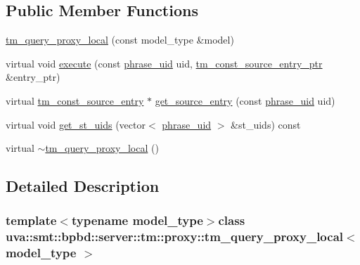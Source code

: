 \subsection*{Public Member Functions}
\begin{DoxyCompactItemize}
\item 
\hyperlink{classuva_1_1smt_1_1bpbd_1_1server_1_1tm_1_1proxy_1_1tm__query__proxy__local_a9daacb7e381485a8926633ff027b6494}{tm\+\_\+query\+\_\+proxy\+\_\+local} (const model\+\_\+type \&model)
\item 
virtual void \hyperlink{classuva_1_1smt_1_1bpbd_1_1server_1_1tm_1_1proxy_1_1tm__query__proxy__local_a4c4222ec70f98b6c2b439e904d2f40a9}{execute} (const \hyperlink{namespaceuva_1_1smt_1_1bpbd_1_1server_ad18d4cdf5504e76c22b0c124ff60b44f}{phrase\+\_\+uid} uid, \hyperlink{namespaceuva_1_1smt_1_1bpbd_1_1server_1_1tm_1_1models_a841bb11e4e9f70fbde7a8ca1ae533681}{tm\+\_\+const\+\_\+source\+\_\+entry\+\_\+ptr} \&entry\+\_\+ptr)
\item 
virtual \hyperlink{namespaceuva_1_1smt_1_1bpbd_1_1server_1_1tm_1_1models_a86b26049fe9aeb13a850852d897a2a77}{tm\+\_\+const\+\_\+source\+\_\+entry} $\ast$ \hyperlink{classuva_1_1smt_1_1bpbd_1_1server_1_1tm_1_1proxy_1_1tm__query__proxy__local_a61cbce7097085593f2cd9c246a438803}{get\+\_\+source\+\_\+entry} (const \hyperlink{namespaceuva_1_1smt_1_1bpbd_1_1server_ad18d4cdf5504e76c22b0c124ff60b44f}{phrase\+\_\+uid} uid)
\item 
virtual void \hyperlink{classuva_1_1smt_1_1bpbd_1_1server_1_1tm_1_1proxy_1_1tm__query__proxy__local_ad7e3bd6b474cb57a7a985a8c61bd65c2}{get\+\_\+st\+\_\+uids} (vector$<$ \hyperlink{namespaceuva_1_1smt_1_1bpbd_1_1server_ad18d4cdf5504e76c22b0c124ff60b44f}{phrase\+\_\+uid} $>$ \&st\+\_\+uids) const 
\item 
virtual \hyperlink{classuva_1_1smt_1_1bpbd_1_1server_1_1tm_1_1proxy_1_1tm__query__proxy__local_afe5b180bf9caabd4fc9e898e16caccc7}{$\sim$tm\+\_\+query\+\_\+proxy\+\_\+local} ()
\end{DoxyCompactItemize}


\subsection{Detailed Description}
\subsubsection*{template$<$typename model\+\_\+type$>$class uva\+::smt\+::bpbd\+::server\+::tm\+::proxy\+::tm\+\_\+query\+\_\+proxy\+\_\+local$<$ model\+\_\+type $>$}

